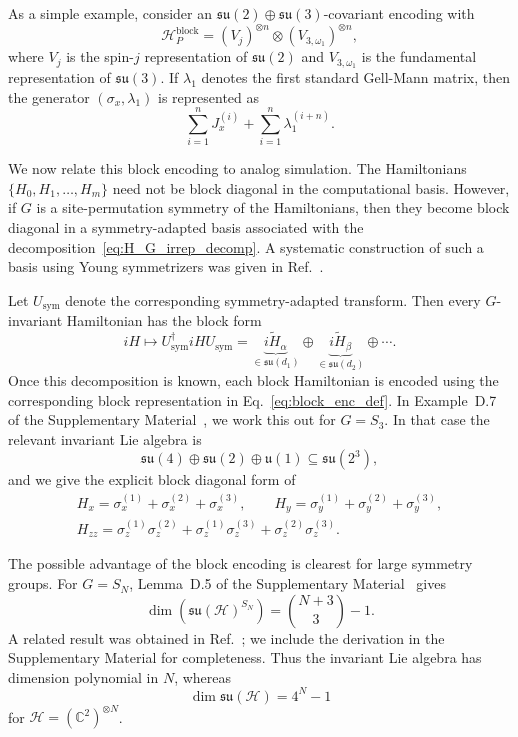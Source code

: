 \documentclass[10pt,twocolumn,superscriptaddress,aps,amsmath,amssymb,citeautoscript,floatfix,prx,longbibliography]{revtex4-2}
\newcounter{alg}
\theoremstyle{plain}
\theoremstyle{plain}
\theoremstyle{plain}
\theoremstyle{plain}
\theoremstyle{plain}
\theoremstyle{plain}
\begin{document}
As a simple example, consider an $\mathfrak{su}(2)\oplus\mathfrak{su}(3)$-covariant encoding with
$$
    \mathcal H_P^{\mathrm{block}}
    =
    (V_j)^{\otimes n}
    \otimes
    (V_{3,\omega_1})^{\otimes n},
$$
where $V_j$ is the spin-$j$ representation of $\mathfrak{su}(2)$ and $V_{3,\omega_1}$ is the fundamental representation of $\mathfrak{su}(3)$. If $\lambda_1$ denotes the first standard Gell-Mann matrix, then the generator $(\sigma_x,\lambda_1)$ is represented as
$$
    \sum_{i=1}^n J_x^{(i)}
    +
    \sum_{i=1}^n \lambda_1^{(i+n)} .
$$

We now relate this block encoding to analog simulation. The Hamiltonians $\{H_0,H_1,\ldots,H_m\}$ need not be block diagonal in the computational basis. However, if $G$ is a site-permutation symmetry of the Hamiltonians, then they become block diagonal in a symmetry-adapted basis associated with the decomposition~\eqref{eq:H_G_irrep_decomp}. A systematic construction of such a basis using Young symmetrizers was given in Ref.~\cite{DAlessandroHartwig2021}.

Let $U_{\mathrm{sym}}$ denote the corresponding symmetry-adapted transform. Then every $G$-invariant Hamiltonian has the block form
$$
    iH
    \longmapsto
    U_{\mathrm{sym}}^\dagger iH U_{\mathrm{sym}}
    =
    \underbrace{i\widetilde H_{\alpha}}_{\in\mathfrak{su}(d_1)}
    \oplus
    \underbrace{i\widetilde H_{\beta}}_{\in\mathfrak{su}(d_2)}
    \oplus
    \cdots .
$$
Once this decomposition is known, each block Hamiltonian is encoded using the corresponding block representation in Eq.~\eqref{eq:block_enc_def}. In Example~D.7 of the Supplementary Material~\cite{SuppMat}, we work this out for $G=S_3$. In that case the relevant invariant Lie algebra is
$$
    \mathfrak{su}(4)
    \oplus
    \mathfrak{su}(2)
    \oplus
    \mathfrak{u}(1)\subseteq \mathfrak{su}(2^3),
$$
and we give the explicit block diagonal form of
\begin{equation}\label{eq:s3_ex_hams}
\begin{gathered}
    H_x
    =
    \sigma_x^{(1)}
    +
    \sigma_x^{(2)}
    +
    \sigma_x^{(3)},
    \qquad
    H_y
    =
    \sigma_y^{(1)}
    +
    \sigma_y^{(2)}
    +
    \sigma_y^{(3)},
    \\
    H_{zz}
    =
    \sigma_z^{(1)}\sigma_z^{(2)}
    +
    \sigma_z^{(1)}\sigma_z^{(3)}
    +
    \sigma_z^{(2)}\sigma_z^{(3)} .
\end{gathered}
\end{equation}

The possible advantage of the block encoding is clearest for large symmetry groups. For $G=S_N$, Lemma~D.5 of the Supplementary Material~\cite{SuppMat} gives
$$
    \dim\left(\mathfrak{su}(\mathcal H)^{S_N}\right)
    =
    \binom{N+3}{3}
    -
    1 .
$$
A related result was obtained in Ref.~\cite{Albertini2018}; we include the derivation in the Supplementary Material for completeness. Thus the invariant Lie algebra has dimension polynomial in $N$, whereas
$$
    \dim\mathfrak{su}(\mathcal H)
    =
    4^N-1
$$
for $\mathcal H=(\mathbb C^2)^{\otimes N}$.
\end{document}
